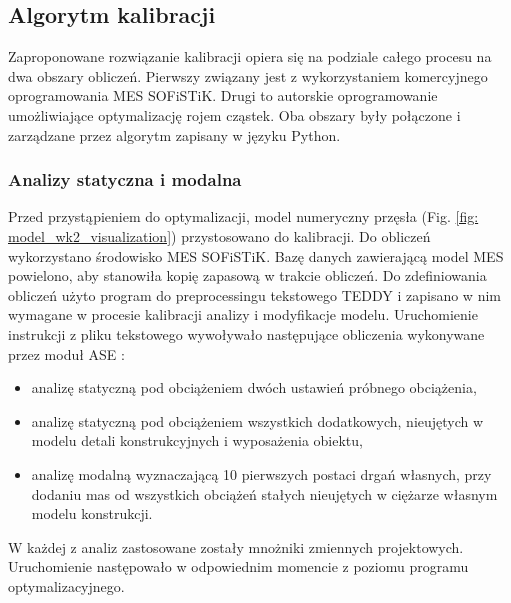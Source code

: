 \begin{table}[h]
	
	\caption{Zakresy dopuszczalnych zmian mass konstrukcyjnych i niekonstrukcyjnych}
	\centering
	\label{tab:calibration_mass}
\end{table}
\subsection{Algorytm kalibracji}
Zaproponowane rozwiązanie kalibracji opiera się na podziale całego procesu na dwa obszary obliczeń. Pierwszy związany jest z wykorzystaniem komercyjnego oprogramowania MES SOFiSTiK. Drugi to autorskie oprogramowanie umożliwiające optymalizację rojem cząstek. Oba obszary były połączone i zarządzane przez algorytm zapisany w języku Python.

\subsubsection{Analizy statyczna i modalna}
Przed przystąpieniem do optymalizacji, model numeryczny przęsła (Fig. \ref{fig: model_wk2_visualization}) przystosowano do kalibracji. Do obliczeń wykorzystano środowisko MES SOFiSTiK. Bazę danych zawierającą model MES powielono, aby stanowiła kopię zapasową w trakcie obliczeń. Do zdefiniowania obliczeń użyto program do preprocessingu tekstowego TEDDY i zapisano w nim wymagane w procesie kalibracji analizy i modyfikacje modelu. Uruchomienie instrukcji z pliku tekstowego wywoływało następujące obliczenia wykonywane przez moduł ASE \parencite{AG2018}:
\begin{itemize}
	\item analizę statyczną pod obciążeniem dwóch ustawień próbnego obciążenia,
	\item analizę statyczną pod obciążeniem wszystkich dodatkowych, nieujętych w modelu detali konstrukcyjnych i wyposażenia obiektu,
	\item analizę modalną wyznaczającą 10 pierwszych postaci drgań własnych, przy dodaniu mas od wszystkich obciążeń stałych nieujętych w ciężarze własnym modelu konstrukcji.
\end{itemize}
W każdej z analiz zastosowane zostały mnożniki zmiennych projektowych. Uruchomienie następowało w odpowiednim momencie z poziomu programu optymalizacyjnego.

